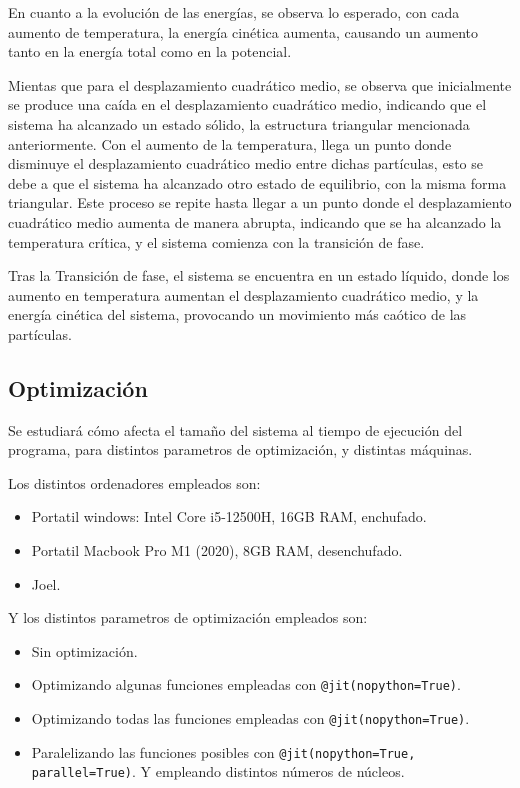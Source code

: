 \documentclass[11pt, twoside]{article} %
\begin{document}
En cuanto a la evolución de las energías, se observa lo esperado, con cada aumento de 
temperatura, la energía cinética aumenta, causando un aumento tanto en la energía
total como en la potencial.

\newpage

Mientas que para el desplazamiento cuadrático medio, se observa que inicialmente se 
produce una caída en el desplazamiento cuadrático medio, indicando que el sistema ha
alcanzado un estado sólido, la estructura triangular mencionada anteriormente. Con el 
aumento de la temperatura, llega un punto donde disminuye el desplazamiento cuadrático
medio entre dichas partículas, esto se debe a que el sistema ha alcanzado otro estado
de equilibrio, con la misma forma triangular. Este proceso se repite hasta llegar a un
punto donde el desplazamiento cuadrático medio aumenta de manera abrupta, indicando que
se ha alcanzado la temperatura crítica, y el sistema comienza con la transición de fase.

Tras la Transición de fase, el sistema se encuentra en un estado líquido, donde los 
aumento en temperatura aumentan el desplazamiento cuadrático medio, y la energía cinética
del sistema, provocando un movimiento más caótico de las partículas.

\newpage

\subsection{Optimización}

Se estudiará cómo afecta el tamaño del sistema al tiempo de ejecución del programa, 
para distintos parametros de optimización, y distintas máquinas.

Los distintos ordenadores empleados son:
\begin{itemize}
    \item Portatil windows: Intel Core i5-12500H, 16GB RAM, enchufado.
    \item Portatil Macbook Pro M1 (2020), 8GB RAM, desenchufado.
    \item Joel.
\end{itemize}
Y los distintos parametros de optimización empleados son:
\begin{itemize}
    \item Sin optimización.
    \item Optimizando algunas funciones empleadas con \texttt{@jit(nopython=True)}.
    \item Optimizando todas las funciones empleadas con \texttt{@jit(nopython=True)}.
    \item Paralelizando las funciones posibles con \texttt{@jit(nopython=True, parallel=True)}.
    Y empleando distintos números de núcleos.
\end{itemize}
\end{document}
